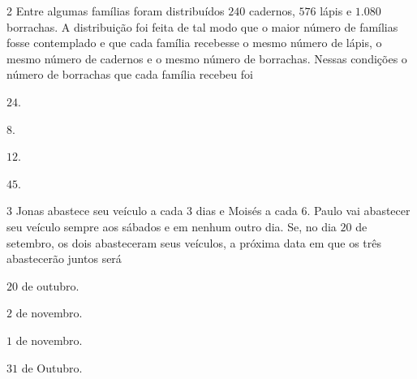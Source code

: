\num{2}  Entre algumas famílias foram distribuídos $240$ cadernos, $576$ lápis e
$1.080$ borrachas. A distribuição foi feita de tal modo que o maior número
de famílias fosse contemplado e que cada família recebesse o mesmo
número de lápis, o mesmo número de cadernos e o mesmo número de
borrachas. Nessas condições o número de borrachas que cada família
recebeu foi

\begin{escolha}
\item $24$.
\item $8$.
\item $12$. 
\item $45$.
\end{escolha}



\num{3}  Jonas abastece seu veículo a cada $3$ dias e Moisés a cada $6$. Paulo vai
abastecer seu veículo sempre aos sábados e em nenhum outro dia. Se, no
dia $20$ de setembro, os dois abasteceram seus veículos, a próxima data em
que os três abastecerão juntos será

\begin{escolha}
\item $20$ de outubro.
\item $2$ de novembro.
\item $1$ de novembro.
\item $31$ de Outubro.
\end{escolha}


